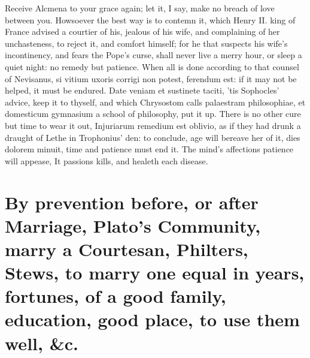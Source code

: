 {Receive Alcmena to your grace again; let it, I say, make no breach of
love between you. Howsoever the best way is to contemn it, which
Henry II. king of France advised a courtier of his, jealous of
his wife, and complaining of her unchasteness, to reject it, and
comfort himself; for he that suspects his wife's incontinency, and
fears the Pope's curse, shall never live a merry hour, or sleep a quiet
night: no remedy but patience. When all is done according to that
counsel of Nevisanus, si vitium uxoris corrigi non potest,
ferendum est: if it may not be helped, it must be endured. Date veniam
et sustinete taciti, 'tis Sophocles' advice, keep it to thyself, and
which Chrysostom calls palaestram philosophiae, et domesticum gymnasium
a school of philosophy, put it up. There is no other cure but time to
wear it out, Injuriarum remedium est oblivio, as if they had drunk a
draught of Lethe in Trophonius' den: to conclude, age will bereave her
of it, dies dolorem minuit, time and patience must end it.
The mind's affections patience will appease,
It passions kills, and healeth each disease.


\section[By prevention before or after Marriage]{By prevention before, or after Marriage, Plato's Community, marry a Courtesan, Philters, Stews, to marry one equal in years, fortunes, of a good family, education, good place, to use them well, \&c.}

}
